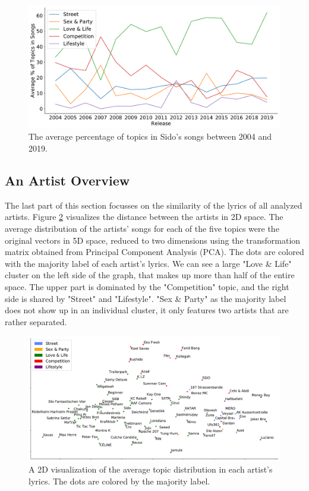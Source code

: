 \documentclass[conference]{IEEEtran}
\begin{document}
\begin{figure}[!t]
\includegraphics[width=\linewidth]{figures/sido.pdf}
\vspace*{-8mm}
\caption{The average percentage of topics in Sido's songs between 2004 and 2019.}
\label{fig:sido}
\end{figure}

\subsection{An Artist Overview}
The last part of this section focusses on the similarity of the lyrics of all analyzed artists. Figure \ref{fig:scatter} visualizes the distance between the artists in 2D space. The average distribution of the artists' songs for each of the five topics were the original vectors in 5D space, reduced to two dimensions using the transformation matrix obtained from Principal Component Analysis (PCA). The dots are colored with the majority label of each artist's lyrics. We can see a large "Love \& Life" cluster on the left side of the graph, that makes up more than half of the entire space. The upper part is dominated by the "Competition" topic, and the right side is shared by "Street" and "Lifestyle". "Sex \& Party" as the majority label does not show up in an individual cluster, it only features two artists that are rather separated.

\begin{figure}[!t]
\includegraphics[width=\linewidth]{figures/scatter.pdf}
\vspace*{-8mm}
\caption{A 2D visualization of the average topic distribution in each artist's lyrics. The dots are colored by the majority label.}
\label{fig:scatter}
\end{figure}
\end{document}
